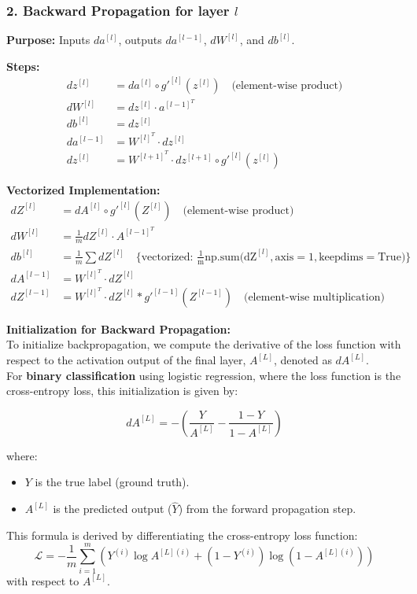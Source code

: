 \documentclass[letterpaper,12pt,notitlepage,twoside]{report}
\begin{document}
\subsubsection{2. Backward Propagation for layer $l$}
\textbf{Purpose:} Inputs \(da^{[l]}\), outputs \(da^{[l-1]}\), \(dW^{[l]}\), and \(db^{[l]}\).

\textbf{Steps:}
\begin{align*}
dz^{[l]} &= da^{[l]} \circ g'^{[l]}(z^{[l]}) \quad \text{(element-wise product)} \\
dW^{[l]} &= dz^{[l]} \cdot a^{[l-1]^T} \\
db^{[l]} &= dz^{[l]} \\
da^{[l-1]} &= W^{[l]^T} \cdot dz^{[l]} \\
dz^{[l]} &= W^{[l+1]^T} \cdot dz^{[l+1]} \circ g'^{[l]}(z^{[l]})
\end{align*}

\textbf{Vectorized Implementation:}
\begin{align*}
dZ^{[l]} &= dA^{[l]} \circ g'^{[l]}(Z^{[l]}) \quad \text{(element-wise product)} \\
dW^{[l]} &= \frac{1}{m} dZ^{[l]} \cdot A^{[l-1]^T} \\
db^{[l]} &= \frac{1}{m} \sum dZ^{[l]} \quad \{ \text{vectorized: } \texttt{\(\frac{1}{\text{m}} \text{np.sum(dZ}^{[l]}, \text{axis}=1, \text{keepdims}=\text{True})\)} \} \\
dA^{[l-1]} &= W^{[l]^T} \cdot dZ^{[l]} \\
dZ^{[l-1]} &= W^{[l]^T} \cdot dZ^{[l]} * g'^{[l-1]}(Z^{[l-1]}) \quad \text{(element-wise multiplication)}
\end{align*}

\textbf{Initialization for Backward Propagation:} \\
To initialize backpropagation, we compute the derivative of the loss function with respect to the activation output of the final layer, \( A^{[L]} \), denoted as \( dA^{[L]} \).  \\ 
For \textbf{binary classification} using logistic regression, where the loss function is the cross-entropy loss, this initialization is given by:

\[
dA^{[L]} = - \left( \frac{Y}{A^{[L]}} - \frac{1 - Y}{1 - A^{[L]}} \right)
\]

\noindent where:
\begin{itemize}[nosep]
    \item \( Y \) is the true label (ground truth).
    \item \( A^{[L]} \) is the predicted output (\( \hat{Y} \)) from the forward propagation step.
\end{itemize}
This formula is derived by differentiating the cross-entropy loss function:
\[
\mathcal{L} = - \frac{1}{m} \sum_{i=1}^m \left( Y^{(i)} \log A^{[L](i)} + (1 - Y^{(i)}) \log (1 - A^{[L](i)}) \right)
\]
with respect to \( A^{[L]} \).
\end{document}
